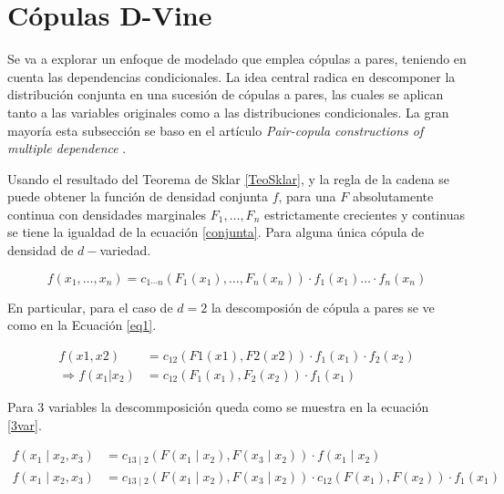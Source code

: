 
\section{Cópulas D-Vine}

Se va a explorar un enfoque de modelado que emplea cópulas a pares, teniendo en cuenta las dependencias condicionales. La idea central radica en descomponer la distribución conjunta en una sucesión de cópulas a pares, las cuales se aplican tanto a las variables originales como a las distribuciones condicionales. La gran mayoría esta subsección se baso en el artículo \textit{Pair-copula constructions of multiple dependence} \cite{PairCopula}.

Usando el resultado del Teorema de Sklar \ref{TeoSklar}, y la regla de la cadena se puede obtener la función de densidad conjunta $f$, para una $F$ absolutamente continua con densidades marginales $F_1, \dots, F_n$ estrictamente crecientes y continuas se tiene la igualdad de la ecuación \eqref{conjunta}. Para alguna única cópula de densidad de $d-$variedad. 

\begin{equation}\label{conjunta}
    f\left( x_1, \dots, x_n\right)=  c_{1 \cdots n} (F_1\left(x_1\right), \ldots, F_n\left(x_n\right) ) \cdot f_1\left(x_1\right) \dots \cdot f_n\left(x_n\right)
\end{equation}

En particular, para el caso de $d = 2$ la descomposión de cópula a pares se ve como en la Ecuación \eqref{eq1}.

\begin{equation} \label{eq1}
    \begin{split}
        f (x1, x2) & = c_{12}(F1(x1), F2(x2)) \cdot f_1(x_1) \cdot f_2(x_2) \\
      \Rightarrow f\left(x_1 | x_2\right) & = c_{12}(F_1\left(x_1\right), F_2\left(x_2\right)) \cdot f_1\left(x_1\right)
    \end{split}
\end{equation}

Para $3$ variables la descommposición queda como se muestra en la ecuación \eqref{3var}.

\begin{equation}\label{3var}
    \begin{split}
        f\left(x_1 \mid x_2, x_3\right) & = c_{13 \mid 2} (F\left(x_1 \mid x_2\right), F\left(x_3 \mid x_2\right) ) \cdot f\left(x_1 \mid x_2\right) \\
        f\left(x_1 \mid x_2, x_3\right) & = c_{13 \mid 2}(F\left(x_1 \mid x_2\right), F\left(x_3 \mid x_2\right)) \cdot c_{12}( F\left(x_1\right), F\left(x_2\right)) \cdot f_1(x_1)
    \end{split}
\end{equation}

